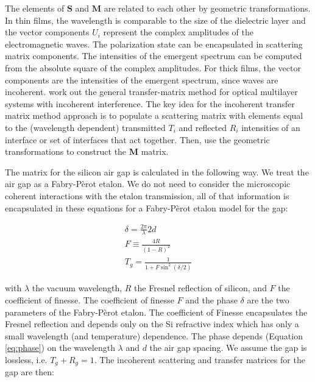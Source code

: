 \documentclass[osajnl,preprint,showpacs,superscriptaddress,12pt]{revtex4-1} %
\begin{document}
The elements of $\boldsymbol{S}$ and $\boldsymbol{M}$ are related to each other by geometric transformations\cite{2007fuph.book.....S}.  In thin films, the wavelength is comparable to the size of the dielectric layer and the vector components $U_{i}$ represent the complex amplitudes of the electromagnetic waves.  The polarization state can be encapsulated in scattering matrix components\cite{2007fuph.book.....S}.  The intensities of the emergent spectrum can be computed from the absolute square of the complex amplitudes.  For thick films, the vector components are the intensities of the emergent spectrum, since waves are incoherent.  \cite{2002ApOpt..41.3978K} work out the general transfer-matrix method for optical multilayer systems with incoherent interference.  The key idea for the incoherent transfer matrix method approach is to populate a scattering matrix with elements equal to the (wavelength dependent) transmitted $T_i$ and reflected $R_i$ intensities of an interface or set of interfaces that act together.  Then, use the geometric transformations to construct the $\boldsymbol{M}$ matrix.

The matrix for the silicon air gap is calculated in the following way.  We treat the air gap as a Fabry-P\`erot etalon.  We do not need to consider the microscopic coherent interactions with the etalon transmission, all of that information is encapsulated in these equations for a Fabry-P\`erot etalon model for the gap:

\begin{eqnarray}
 \delta = \frac{2\pi}{\lambda}2d \label{eq:phase} \\
  F \equiv \frac{4R}{(1-R)^2} \\
 T_g = \frac{1}{1+F\sin^2(\delta/2)}  \label{eq:FabPerot}
\end{eqnarray}

with $\lambda$ the vacuum wavelength, $R$ the Fresnel reflection of silicon, and $F$ the coefficient of finesse.  The coefficient of finesse $F$ and the phase $\delta$ are the two parameters of the Fabry-P\`erot etalon.  The coefficient of Finesse encapsulates the Fresnel reflection and depends only on the Si refractive index which has only a small wavelength (and temperature) dependence.  The phase depends (Equation \ref{eq:phase}) on the wavelength $\lambda$ and $d$ the air gap spacing.  We assume the gap is lossless, i.e. $T_g+R_g=1$.  The incoherent scattering and transfer matrices for the gap are then:
\end{document}

